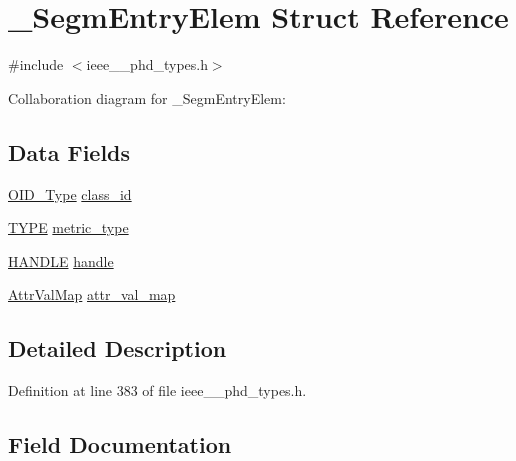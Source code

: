\hypertarget{struct___segm_entry_elem}{}\section{\+\_\+\+Segm\+Entry\+Elem Struct Reference}
\label{struct___segm_entry_elem}


{\ttfamily \#include $<$ieee\+\_\+\_\+phd\+\_\+types.\+h$>$}



Collaboration diagram for \+\_\+\+Segm\+Entry\+Elem\+:
\subsection*{Data Fields}
\begin{DoxyCompactItemize}
\item 
\hyperlink{ieee__11073__phd__types_8h_aa4d7af235d4a95d6632aa0d64160dd62}{O\+I\+D\+\_\+\+Type} \hyperlink{struct___segm_entry_elem_ad0a510237949ff545815366adea89f8b}{class\+\_\+id}
\item 
\hyperlink{ieee__11073__phd__types_8h_a56278ab9208915aa619527c8d826835a}{T\+Y\+P\+E} \hyperlink{struct___segm_entry_elem_a34ce56177f5504256755d9e1d12f4435}{metric\+\_\+type}
\item 
\hyperlink{ieee__11073__phd__types_8h_a76f0d44d294babf2e568f7ee676ffca6}{H\+A\+N\+D\+L\+E} \hyperlink{struct___segm_entry_elem_a07ff1fa563f3d58110ce80c3c1796f9b}{handle}
\item 
\hyperlink{ieee__11073__phd__types_8h_ab20bcd780b908d5c4042de115e0af8d7}{Attr\+Val\+Map} \hyperlink{struct___segm_entry_elem_af0de5a153ac1e3ed23cc9a8010d054fc}{attr\+\_\+val\+\_\+map}
\end{DoxyCompactItemize}


\subsection{Detailed Description}


Definition at line 383 of file ieee\+\_\+\_\+phd\+\_\+types.\+h.



\subsection{Field Documentation}
\hypertarget{struct___segm_entry_elem_af0de5a153ac1e3ed23cc9a8010d054fc}{}
